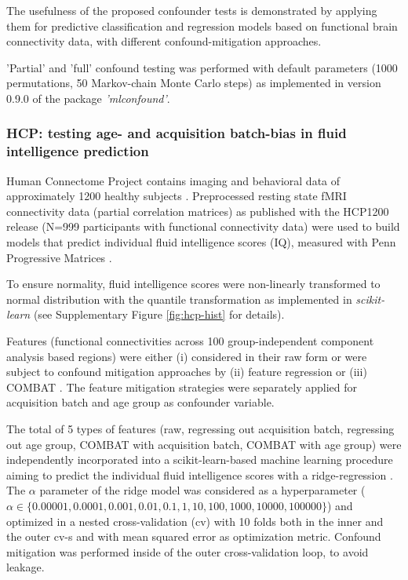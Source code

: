 \documentclass{article}
\begin{document}
The usefulness of the proposed confounder tests is demonstrated by applying them for predictive classification and regression models based on functional brain connectivity data, with different confound-mitigation approaches. 

'Partial' and 'full' confound testing was performed with default parameters (1000 permutations, 50 Markov-chain Monte Carlo steps) as implemented in version 0.9.0 of the package \emph{'mlconfound'}.

\subsubsection*{HCP: testing age- and acquisition batch-bias in fluid intelligence prediction}

Human Connectome Project contains imaging and behavioral data of approximately 1200 healthy subjects \citep{van2013wu}. Preprocessed resting state fMRI connectivity data (partial correlation matrices) \citep{glasser2013minimal} as published with the HCP1200 release (N=999 participants with functional connectivity data) were used to build models that predict individual fluid intelligence scores (IQ), measured with Penn Progressive Matrices \citep{duncan2000neural}.

To ensure normality, fluid intelligence scores were non-linearly transformed to normal distribution with the quantile transformation \citep{beasley2009rank} as implemented in \emph{scikit-learn} \citep{pedregosa2011scikit} (see Supplementary Figure \ref{fig:hcp-hist} for details).

Features (functional connectivities across 100 group-independent component analysis based regions) were either (i) considered in their raw form or were subject to confound mitigation approaches by (ii) feature regression \citep{rao2017predictive} or (iii) COMBAT \citep{johnson2007adjusting, fortin2018harmonization}.
The feature mitigation strategies were separately applied for acquisition batch and age group as confounder variable.

The total of 5 types of features (raw, regressing out acquisition batch, regressing out age group, COMBAT with acquisition batch, COMBAT with age group) were independently incorporated into a scikit-learn-based \citep{pedregosa2011scikit} machine learning procedure aiming to predict the individual fluid intelligence scores with a ridge-regression \citep{hoerl1970ridge}. The $\alpha$ parameter of the ridge model was considered as a hyperparameter ($\alpha \in \{0.00001, 0.0001, 0.001, 0.01, 0.1, 1, 10, 100, 1000, 10000, 100000\}$) and optimized in a nested cross-validation (cv) with 10 folds both in the inner and the outer cv-s and with mean squared error as optimization metric. Confound mitigation was performed inside of the outer cross-validation loop, to avoid leakage.
\end{document}
